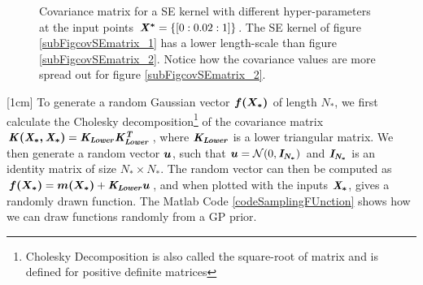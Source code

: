\begin{figure}[!ht]
  \centering
    \quad
{}\quad
  
       \caption{Covariance matrix for a SE kernel with different hyper-parameters at the input points $\bm{\mathit{X^{*}}} = \{[0:0.02:1]\}$. The SE kernel of figure \ref{subFigcovSEmatrix_1} has a lower length-scale than figure \ref{subFigcovSEmatrix_2}. Notice how the covariance values are more spread out for figure \ref{subFigcovSEmatrix_2}.}\label{figGPCovarianceMatrix}
\end{figure}

[1cm]
To generate a random Gaussian vector $\boldsymbol{f(X_{*})}$ of length $N_{*}$, we first calculate the Cholesky decomposition\footnote{Cholesky Decomposition is also called the square-root of matrix and is defined for positive definite matrices} of the covariance matrix $\bm{\mathit{K(X_{*}, X_{*})}} = \bm{\mathit{K_{Lower}}}\bm{\mathit{K_{Lower}^{T}}}$, where $\bm{\mathit{K_{Lower}}}$ is a lower triangular matrix. We then generate a random vector $\boldsymbol{u}$, such that $\boldsymbol{u} = \mathcal{N}(0, \bm{\mathit{I_{N_*}}})$ and $\bm{\mathit{I_{N_*}}}$ is an identity matrix of size $N_{*} \times N_{*}$.  The random vector can then be computed as $\boldsymbol{f(X_{*})} = \boldsymbol{m(X_{*})} + \bm{\mathit{K_{Lower}}}\boldsymbol{u}$, and when plotted with the inputs $\bm{\mathit{X_{*}}}$, gives a randomly drawn function. The Matlab Code \ref{codeSamplingFUnction} shows how we can draw functions randomly from a GP prior.

